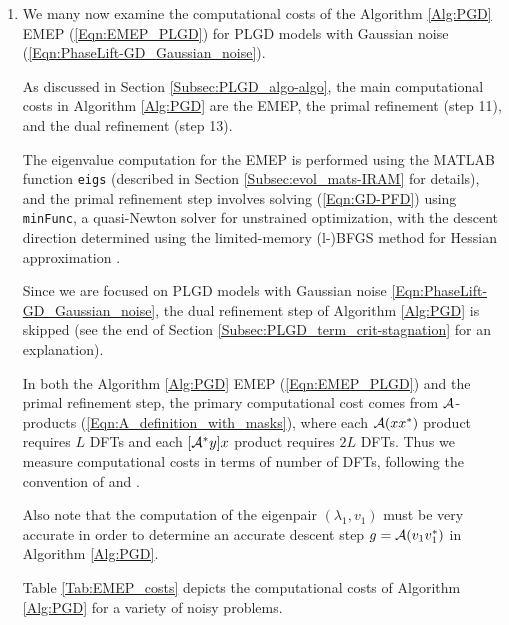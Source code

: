 \begin{enumerate}
\item

We many now examine the computational costs of the Algorithm \ref{Alg:PGD} EMEP (\ref{Eqn:EMEP_PLGD}) for PLGD models with Gaussian noise (\ref{Eqn:PhaseLift-GD_Gaussian_noise}).  


As discussed in Section \ref{Subsec:PLGD_algo-algo}, the main computational costs in Algorithm \ref{Alg:PGD} are the EMEP, the primal refinement (step 11), and the dual refinement (step 13).  

The eigenvalue computation for the EMEP is performed using the MATLAB function \texttt{eigs} (described in Section \ref{Subsec:evol_mats-IRAM} for details), and the primal refinement step involves solving (\ref{Eqn:GD-PFD}) using \texttt{minFunc}, a quasi-Newton solver for unstrained optimization, with the descent direction determined using the limited-memory (l-)BFGS method for Hessian approximation \cite{schmidt2005minFunc}.  

Since we are focused on PLGD models with Gaussian noise \ref{Eqn:PhaseLift-GD_Gaussian_noise}, the dual refinement step of Algorithm \ref{Alg:PGD} is skipped (see the end of Section \ref{Subsec:PLGD_term_crit-stagnation} for an explanation).

In both the Algorithm \ref{Alg:PGD} EMEP (\ref{Eqn:EMEP_PLGD}) and the primal refinement step, the primary computational cost comes from ${\mathcal A}$-products (\ref{Eqn:A_definition_with_masks}), where each ${\mathcal A}(xx^*)$ product requires $L$ DFTs and each $[{\mathcal A}^*y]x$ product requires $2L$ DFTs.  Thus we measure computational costs in terms of number of DFTs, following the convention of \cite{DBLP:journals/tit/CandesLS15} and \cite{DBLP:journals/siamsc/FriedlanderM16}.

Also note that the computation of the eigenpair $(\lambda_1, v_1)$ must be very accurate in order to determine an accurate descent step $g = {\mathcal A}(v_1v_1^*)$ in Algorithm \ref{Alg:PGD}.


Table \ref{Tab:EMEP_costs} depicts the computational costs of Algorithm \ref{Alg:PGD} for a variety of noisy problems.
\begin{table}[H]
\centering
\begin{footnotesize}
\hbox{

}
\end{footnotesize}
\end{table}
\end{enumerate}

